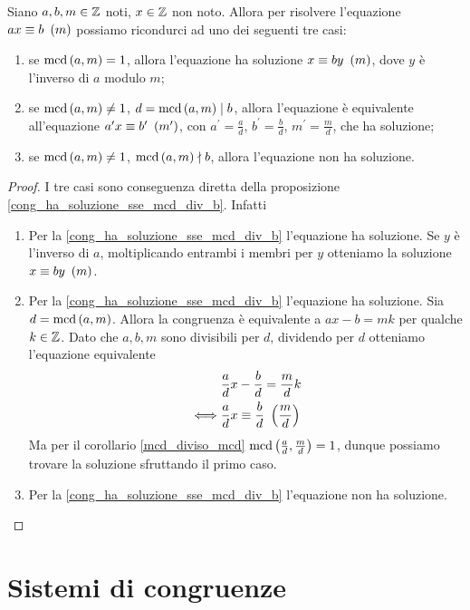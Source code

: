 \begin{proposition}
    Siano $a, b, m \in \mathbb{Z}$ noti, $x \in \mathbb{Z}$ non noto. Allora per risolvere l'equazione $ax \equiv b \ \left(m\right)$ possiamo ricondurci ad uno dei seguenti tre casi:
    \begin{enumerate}
        \item se $\operatorname{mcd}\left(a, m\right) = 1$, allora l'equazione ha soluzione $x \equiv by \ \left(m\right)$, dove $y$ è l'inverso di $a$ modulo $m$;
        \item se $\operatorname{mcd}\left(a, m\right) \neq 1$, $d = \operatorname{mcd}\left(a, m\right) \mid b$, allora l'equazione è equivalente all'equazione $a^\prime x \equiv b^\prime \ \left(m^\prime\right)$, con $a^\prime = \frac{a}{d}$, $b^\prime = \frac{b}{d}$, $m^\prime = \frac{m}{d}$, che ha soluzione;
        \item se $\operatorname{mcd}\left(a, m\right) \neq 1$, $\operatorname{mcd}\left(a, m\right) \nmid b$, allora l'equazione non ha soluzione.
    \end{enumerate}
\end{proposition}
\begin{proof}
    I tre casi sono conseguenza diretta della proposizione \ref{cong_ha_soluzione_sse_mcd_div_b}. Infatti
    \begin{enumerate}
        \item Per la \ref{cong_ha_soluzione_sse_mcd_div_b} l'equazione ha soluzione. Se $y$ è l'inverso di $a$, moltiplicando entrambi i membri per $y$ otteniamo la soluzione $x \equiv by \ \left(m\right)$.
        \item Per la \ref{cong_ha_soluzione_sse_mcd_div_b} l'equazione ha soluzione. 
        Sia $d = \operatorname{mcd}\left(a, m\right)$. Allora la congruenza è equivalente a $ax - b = mk$ per qualche $k \in \mathbb{Z}$. Dato che $a, b, m$ sono divisibili per $d$, dividendo per $d$ otteniamo l'equazione equivalente
        \begin{alignat*}
            {1}
            &\frac{a}{d}x - \frac{b}{d} = \frac{m}{d}k \\
            \iff &\frac{a}{d}x \equiv \frac{b}{d} \ \left(\frac{m}{d}\right)
        \end{alignat*}
        Ma per il corollario \ref{mcd_diviso_mcd} $\operatorname{mcd}\left(\frac{a}{d}, \frac{m}{d}\right) = 1$, dunque possiamo trovare la soluzione sfruttando il primo caso.
        \item Per la \ref{cong_ha_soluzione_sse_mcd_div_b} l'equazione non ha soluzione. \qedhere
    \end{enumerate}
\end{proof}

\section{Sistemi di congruenze}

